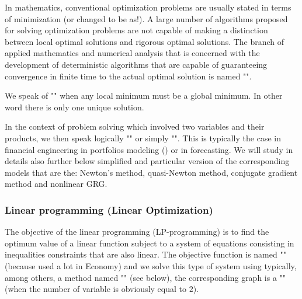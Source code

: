 	In mathematics, conventional optimization problems are usually stated in terms of minimization (or changed to be as!). A large number of algorithms proposed for solving optimization problems are not capable of making a distinction between local optimal solutions and rigorous optimal solutions. The branch of applied mathematics and numerical analysis that is concerned with the development of deterministic algorithms that are capable of guaranteeing convergence in finite time to the actual optimal solution is named "".
	\begin{tcolorbox}[title=Remark,colframe=black,arc=10pt]
	We speak of "" when any local minimum must be a global minimum. In other word there is only one unique solution.
	\end{tcolorbox}
	In the context of problem solving which involved two variables and their products, we then speak logically "" or simply "". This is typically the case in financial engineering in portfolios modeling  () or in forecasting. We will study in details also further below simplified and particular version of the corresponding models that are the: Newton's method, quasi-Newton method, conjugate gradient method and nonlinear GRG.

	\pagebreak
	\subsubsection{Linear programming (Linear Optimization)}
	The objective of the linear programming (LP-programming) is to find the optimum value of a linear function subject to a system of equations consisting in inequalities constraints that are also linear. The objective function is named "" (because used a lot in Economy) and we solve this type of system using typically, among others, a method named "" (see below), the corresponding graph is a "" (when the number of variable is obviously equal to $2$).
	
